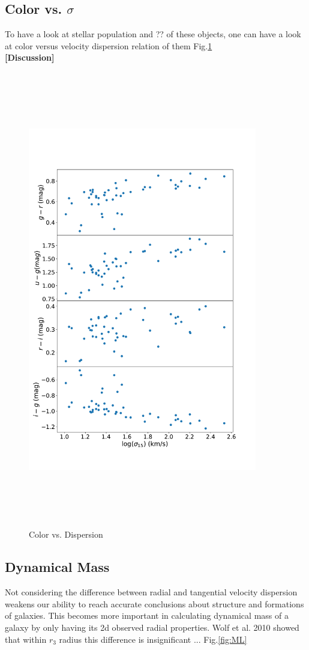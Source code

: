 \documentclass{aa}
\begin{document}
\subsection{Color vs. $\sigma$}
To have a look at stellar population and ?? of these objects, one can have a look at color versus velocity dispersion relation of them Fig.\ref{fig:CI-S}\\
\textbf{[Discussion]} 
\begin{figure}[!htb]
   \centering
   \includegraphics[width=10cm,height=20cm,keepaspectratio]{../2_pipeline/3_color_Disp/Color_Disp.pdf}
         \caption{Color vs. Dispersion}
         \label{fig:CI-S}
\end{figure}

\subsection{Dynamical Mass}
Not considering the difference between radial and tangential velocity dispersion weakens our ability to reach accurate conclusions about structure and formations of galaxies. This becomes more important in calculating dynamical mass of a galaxy by only having its 2d observed radial properties. Wolf et al. 2010 showed that within $r_3$ radius this difference is insignificant ...
Fig.\ref{fig:ML}
\end{document}
